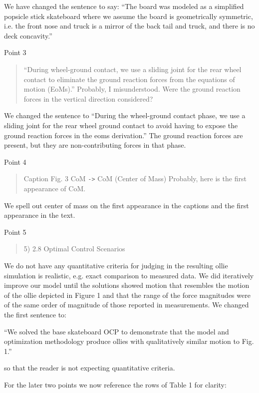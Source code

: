 \documentclass{letter}
\begin{document}
\begin{letter}{}
We have changed the sentence to say: ``The board was modeled as a simplified popsicle stick skateboard where we assume the board is geometrically symmetric, i.e. the front nose and truck is a mirror of the back tail and truck, and there is no deck concavity.''

Point 3

\begin{quote}
    “During wheel-ground contact, we use a sliding joint for the rear wheel contact to eliminate the ground reaction forces from the equations of motion (EoMs).” Probably, I misunderstood. Were the ground reaction forces in the vertical direction considered?
\end{quote}

We changed the sentence to ``During the wheel-ground contact phase, we use a sliding joint for the rear wheel ground contact to avoid having to expose the ground reaction forces in the \glspl{eom} derivation.'' The ground reaction forces are present, but they are non-contributing forces in that phase.

Point 4

\begin{quote}
    Caption Fig. 3 CoM \verb|->| CoM (Center of Mass) Probably, here is the first appearance of CoM.
\end{quote}

We spell out center of mass on the first appearance in the captions and the first appearance in the text.

Point 5

\begin{quote}
    5) 2.8 Optimal Control Scenarios
\end{quote}

We do not have any quantitative criteria for judging in the resulting ollie simulation is realistic, e.g. exact comparison to measured data. We did iteratively improve our model until the solutions showed motion that resembles the motion of the ollie depicted in Figure 1 and that the range of the force magnitudes were of the same order of magnitude of those reported in measurements. We changed the first sentence to:

``We solved the base skateboard OCP to demonstrate that the model and optimization methodology produce ollies with qualitatively similar motion to Fig. 1.''

so that the reader is not expecting quantitative criteria.

For the later two points we now reference the rows of Table 1 for clarity:


\end{letter}
\end{document}
